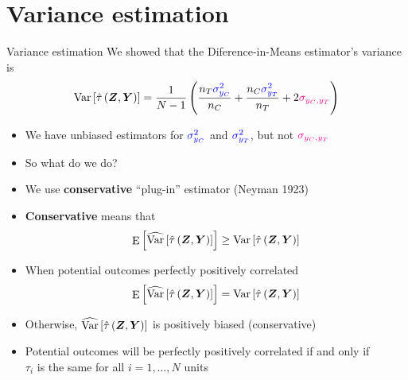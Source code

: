\documentclass[table, xcolor = {dvipsnames}, 9pt]{beamer}
\theoremstyle{plain}
\newcommand{\bh}[1]{{\color{blue}{#1}}}
\newcommand{\mh}[1]{{\color{magenta}{#1}}}
\DeclareMathOperator{\E}{\rm{E}}
\DeclareMathOperator{\Var}{\rm{Var}}
\begin{document}
\section{Variance estimation}
\begin{frame}{Variance estimation} 
We showed that the Diference-in-Means estimator's variance is \vspace{1em}
\begin{equation*}
\Var\left[\hat{\tau}\left(\bm{Z}, \bm{Y}\right)\right] = \frac{1}{N - 1}\left(\frac{n_T \bh{\sigma^2_{y_C}}}{n_C} + \frac{n_C \bh{\sigma^2_{y_T}}}{n_T} + 2\mh{\sigma_{y_C, y_T}}\right)
\end{equation*}
\begin{itemize}
\item We have unbiased estimators for $\bh{\sigma^2_{y_C}}$ and $\bh{\sigma^2_{y_T}}$, but not $\mh{\sigma_{y_C, y_T}}$
\item So what do we do? \pause
\item We use \textbf{conservative} ``plug-in'' estimator (Neyman 1923)
\item \textbf{Conservative} means that
\begin{equation*}
\E\left[\widehat{\Var}\left[\hat{\tau}\left(\bm{Z}, \bm{Y}\right)\right]\right] \geq \Var\left[\hat{\tau}\left(\bm{Z}, \bm{Y}\right)\right]
\end{equation*} \pause
\item When potential outcomes perfectly positively correlated
\begin{equation*}
\E\left[\widehat{\Var}\left[\hat{\tau}\left(\bm{Z}, \bm{Y}\right)\right]\right] = \Var\left[\hat{\tau}\left(\bm{Z}, \bm{Y}\right)\right]
\end{equation*}
\item Otherwise, $\widehat{\Var}\left[\hat{\tau}\left(\bm{Z}, \bm{Y}\right)\right]$ is positively biased (conservative) \pause
\item Potential outcomes will be perfectly positively correlated if and only if \\ $\tau_i$ is the same for all $i = 1, \ldots , N$ units
\end{itemize}
\end{frame}
\end{document}
